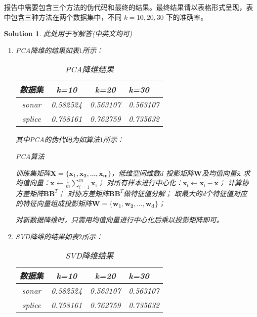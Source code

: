 \documentclass[a4paper,UTF8]{article}
\numberwithin{equation}{section}
\newtheorem*{solution}{Solution}
\begin{document}
报告中需要包含三个方法的伪代码和最终的结果。最终结果请以表格形式呈现，表中包含三种方法在两个数据集中，不同 $k=10,20,30$ 下的准确率。
\newpage

\begin{solution}
	此处用于写解答(中英文均可)
	\begin{enumerate}
	\item PCA降维的结果如表$1$所示：
	\begin{table}[htbp]
  		\centering
  		\begin{tabular}{cccp{38mm}}
	    \toprule
	    \textbf{数据集} & \textbf{k=10} & \textbf{k=20} & \textbf{k=30} \\
	    \midrule
	    sonar  & 0.582524 & 0.563107 & 0.563107\\
	    splice & 0.758161 & 0.762759 & 0.735632\\
	    \bottomrule
  		\end{tabular}
  		\caption{PCA降维结果}\label{table:1}
	\end{table}

	其中PCA的伪代码为如算法$1$所示：
	   	\begin{algorithm}[htbp]  
	        \caption{PCA算法}  
	        \begin{algorithmic}[1] %
	            \Require 训练集矩阵$\mathbf{X}=\{\mathbf{x_1}, \mathbf{x_2},\dots,\mathbf{x_m}\}$，低维空间维数$d$ 
	            \Ensure 投影矩阵$\mathbf{W}$及均值向量$\bar{\mathbf{x}}$  
	            \State 求均值向量：$\bar{\mathbf{x}} \gets \frac{1}{m}\sum_{i=1}^{m}\mathbf{x_i}$；
	            \State 对所有样本进行中心化：$\mathbf{x_i} \gets \mathbf{x_i} - \bar{\mathbf{x}}$；
	            \State 计算协方差矩阵$\mathbf{B}\mathbf{B}^T$；
	            \State 对协方差矩阵$\mathbf{B}\mathbf{B}^T$做特征值分解；
	            \State 取最大的d个特征值对应的特征向量组成投影矩阵$\mathbf{W}=\{\mathbf{w_1}, \mathbf{w_2},\dots,\mathbf{w_d}\}$；
	            \State {}
	        \end{algorithmic}  
    	\end{algorithm} 

    对新数据降维时，只需用均值向量进行中心化后乘以投影矩阵即可。
	\item SVD降维的结果如表$2$所示：
	\begin{table}[htbp]
  		\centering
  		\begin{tabular}{cccp{38mm}}
	    \toprule
	    \textbf{数据集} & \textbf{k=10} & \textbf{k=20} & \textbf{k=30} \\
	    \midrule
	    sonar  & 0.582524 & 0.563107 & 0.563107\\
	    splice & 0.758161 & 0.762759 & 0.735632\\
	    \bottomrule
  		\end{tabular}
  		\caption{SVD降维结果}\label{table:1}
	\end{table}


\end{enumerate}
\end{solution}
\end{document}
